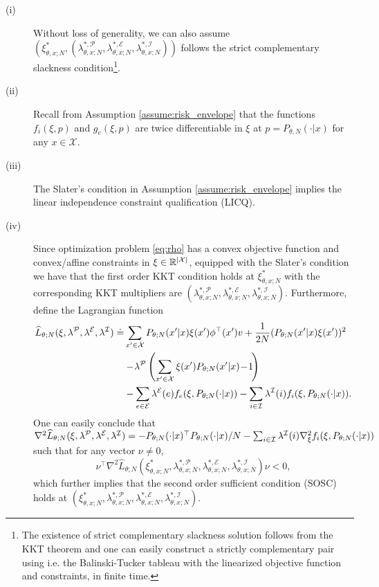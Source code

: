 \begin{description}
\item[(i)] Without loss of generality, we can also assume $(\xi^*_{\theta,x;N},(\lambda^{*,\mathcal P}_{\theta,x;N},\lambda^{*,\mathcal E}_{\theta,x;N},\lambda^{*,\mathcal I}_{\theta,x;N}))$ follows the strict complementary slackness condition\footnote{The existence of strict complementary slackness solution follows from the KKT theorem and one can easily construct a strictly complementary pair using i.e. the Balinski-Tucker tableau with the linearized objective function and constraints, in finite time.}.
\item[(ii)] Recall from Assumption \ref{assume:risk_envelope} that the functions $f_i({\xi},p)$ and $g_e(\xi,p)$ are twice differentiable in $\xi$ at $p=P_{\theta,N}(\cdot|x)$ for any $x\in\mathcal X$.
\item[(iii)] The Slater's condition in Assumption \ref{assume:risk_envelope} implies the linear independence constraint qualification (LICQ).
\item[(iv)] Since optimization problem \eqref{eq:rho} has a convex objective function and convex/affine constraints in $\xi\in{\mathbb{R}}^{|\mathcal X|}$, equipped with the Slater's condition we have that the first order KKT condition holds at $\xi^*_{\theta,x;N}$ with the corresponding KKT multipliers are $(\lambda^{*,\mathcal P}_{\theta,x;N},\lambda^{*,\mathcal E}_{\theta,x;N},\lambda^{*,\mathcal I}_{\theta,x;N})$. Furthermore, define the Lagrangian function
\begin{equation*}
\begin{split}
\widehat{L}_{\theta;N}(\xi,\lambda^{\mathcal P},\lambda^{\mathcal E},\lambda^{\mathcal I})\doteq&\sum_{x'\in\mathcal X} P_{\theta;N}(x'|x) \xi(x')\phi^\top(x')v+\frac{1}{2N}(P_{\theta;N}(x'|x) \xi(x'))^2\!\\&-\!\lambda^{\mathcal P}\left(\sum_{x' \in \mathcal X}\xi(x')P_{\theta;N}(x'|x)\!-\!1\!\right)\\
&-\sum_{e\in\mathcal E}\lambda^{\mathcal E}(e) f_e(\xi,P_{\theta;N}(\cdot|x))-\sum_{i\in\mathcal I}\lambda^{\mathcal I}(i) f_i(\xi,P_{\theta;N}(\cdot|x)).
\end{split}
\end{equation*}
One can easily conclude that $\nabla^2 \widehat{L}_{\theta;N}(\xi,\lambda^{\mathcal P},\lambda^{\mathcal E},\lambda^{\mathcal I})=-P_{\theta;N}(\cdot|x)^\top P_{\theta;N}(\cdot|x)/N-\sum_{i\in\mathcal I}\lambda^{\mathcal I}(i) \nabla^2_\xi f_i(\xi,P_{\theta;N}(\cdot|x))$ such that for any vector $\nu\neq 0$,
\[
\nu^\top \nabla^2\widehat{L}_{\theta;N}(\xi^*_{\theta,x;N},\lambda^{*,\mathcal P}_{\theta,x;N},\lambda^{*,\mathcal E}_{\theta,x;N},\lambda^{*,\mathcal I}_{\theta,x;N}) \nu< 0,
\]
which further implies that the second order sufficient condition (SOSC) holds at $(\xi^*_{\theta,x;N},\lambda^{*,\mathcal P}_{\theta,x;N},\lambda^{*,\mathcal E}_{\theta,x;N},\lambda^{*,\mathcal I}_{\theta,x;N})$.
\end{description}
